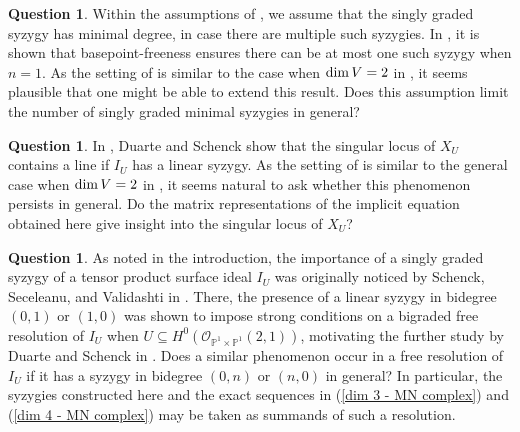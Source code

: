 \documentclass[reqno]{amsart}
\numberwithin{equation}{section}
\theoremstyle{definition}
\newtheorem{quest}[thm]{Question}
\def\O{\mathcal{O}}
\def\P{\mathbb{P}}
\def\dim{\mathop{\rm dim}}
\begin{document}
\begin{quest}
Within the assumptions of , we assume that the singly graded syzygy has minimal degree, in case there are multiple such syzygies. In \cite{DS16}, it is shown that basepoint-freeness ensures there can be at most one such syzygy when $n=1$. As the setting of \cite{DS16} is similar to the case when $\dim V=2$ in , it seems plausible that one might be able to extend this result. Does this assumption limit the number of singly graded minimal syzygies in general?
\end{quest}



\begin{quest}
In \cite{DS16}, Duarte and Schenck show that the singular locus of $X_U$ contains a line if $I_U$ has a linear syzygy. As the setting of \cite{DS16} is similar to the general case when $\dim V=2$ in , it seems natural to ask whether this phenomenon persists in general. Do the matrix representations of the implicit equation obtained here give insight into the singular locus of $X_U$?
\end{quest}



\begin{quest}
As noted in the introduction, the importance of a singly graded syzygy of a tensor product surface ideal $I_U$ was originally noticed by Schenck, Seceleanu, and Validashti in \cite{SSV14}. There, the presence of a linear syzygy in bidegree $(0,1)$ or $(1,0)$ was shown to impose strong conditions on a bigraded free resolution of $I_U$ when $U\subseteq H^0(\O_{\P^1\times \P^1}(2,1))$, motivating the further study by Duarte and Schenck in \cite{DS16}. Does a similar phenomenon occur in a free resolution of $I_U$ if it has a syzygy in bidegree $(0,n)$ or $(n,0)$ in general? In particular, the syzygies constructed here and the exact sequences in (\ref{dim 3 - MN complex}) and (\ref{dim 4 - MN complex}) may be taken as summands of such a resolution.
\end{quest}




\end{document}
